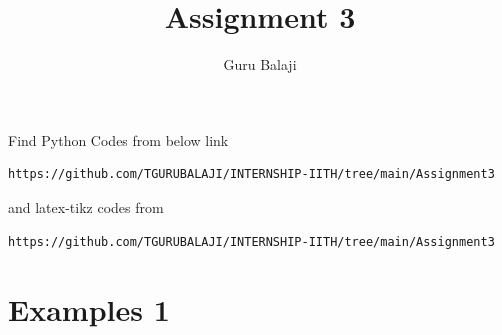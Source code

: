 \documentclass[journal,12pt,twocolumn]{IEEEtran}
\begin{document}
\providecommand{\fourier}{\overset{\mathcal{F}}{ \rightleftharpoons}}
\providecommand{\system}{\overset{\mathcal{H}}{ \longleftrightarrow}}
\newcommand{\solution}{\noindent \textbf{Solution: }}
\newcommand{\cosec}{\,\text{cosec}\,}
\providecommand{\dec}[2]{\ensuremath{\overset{#1}{\underset{#2}{\gtrless}}}}
\newcommand{\myvec}[1]{\ensuremath{\begin{pmatrix}#1\end{pmatrix}}}
\newcommand{\mydet}[1]{\ensuremath{\begin{vmatrix}#1\end{vmatrix}}}
\makeatletter
{}
\makeatother
\let\StandardTheFigure\thefigure
\let\vec\mathbf
\renewcommand{\thefigure}{\theproblem}
\def\putbox#1#2#3{\makebox[0in][l]{\makebox[#1][l]{}\raisebox{\baselineskip}[0in][0in]{\raisebox{#2}[0in][0in]{#3}}}}
     \def\rightbox#1{\makebox[0in][r]{#1}}
     \def\centbox#1{\makebox[0in]{#1}}
     \def\topbox#1{\raisebox{-\baselineskip}[0in][0in]{#1}}
     \def\midbox#1{\raisebox{-0.5\baselineskip}[0in][0in]{#1}}
\vspace{3cm}
\title{Assignment 3}
\author{Guru Balaji}
\maketitle
\newpage
\bigskip
\renewcommand{\thefigure}{\theenumi}
\renewcommand{\thetable}{\theenumi}
Find Python Codes from below link 
%
\begin{lstlisting}
https://github.com/TGURUBALAJI/INTERNSHIP-IITH/tree/main/Assignment3
\end{lstlisting}
%
and latex-tikz codes from 
%
\begin{lstlisting}
https://github.com/TGURUBALAJI/INTERNSHIP-IITH/tree/main/Assignment3
\end{lstlisting}
%

\section{Examples 1}
\end{document}
